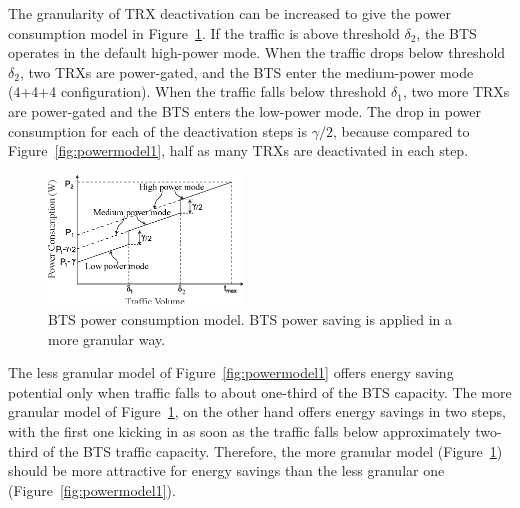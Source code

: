 The granularity of TRX deactivation can be increased to give the power consumption model in Figure~\ref{fig:powermodel2}. If the traffic is above threshold $\delta_2$, the BTS operates in the default high-power mode. When the traffic drops below threshold $\delta_2$, two TRXs are power-gated, and the BTS enter the medium-power mode (4+4+4 configuration). When the traffic falls below threshold $\delta_1$, two more TRXs are power-gated and the BTS enters the low-power mode. The drop in power consumption for each of the deactivation steps is $\gamma/2$, because compared to Figure~\ref{fig:powermodel1}, half as many TRXs are deactivated in each step.

\begin{figure}
\centering
\includegraphics[width=0.46\textwidth]{figures/powermodel2-1.eps}
\caption{BTS power consumption model. BTS power saving is applied in a more granular way.}
\label{fig:powermodel2}
\end{figure}

The less granular model of Figure~\ref{fig:powermodel1} offers energy saving potential only when traffic falls to about one-third of the BTS capacity. The more granular model of Figure~\ref{fig:powermodel2}, on the other hand offers energy savings in two steps, with the first one kicking in as soon as the traffic falls below approximately two-third of the BTS traffic capacity. Therefore, the more granular model (Figure~\ref{fig:powermodel2}) should be more attractive for energy savings than the less granular one (Figure~\ref{fig:powermodel1}).

